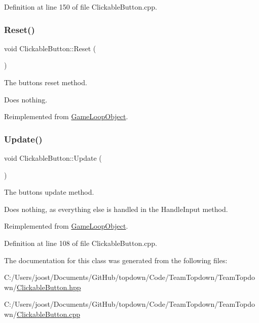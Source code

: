 Definition at line 150 of file Clickable\+Button.\+cpp.

\mbox{\label{class_clickable_button_a01ae3f140debdc8b525e1ef745bdbff3}} 
\subsubsection{\texorpdfstring{Reset()}{Reset()}}
{\footnotesize\ttfamily void Clickable\+Button\+::\+Reset (\begin{DoxyParamCaption}{ }\end{DoxyParamCaption})\hspace{0.3cm}{\ttfamily [virtual]}}



The button\textquotesingle{}s reset method. 

Does nothing. 

Reimplemented from \hyperlink{class_game_loop_object_af61e973be170cb9437a5b7d9ecd6ef53}{Game\+Loop\+Object}.

\mbox{\label{class_clickable_button_a393e1529583626f6ee52f0955bd68da8}} 
\subsubsection{\texorpdfstring{Update()}{Update()}}
{\footnotesize\ttfamily void Clickable\+Button\+::\+Update (\begin{DoxyParamCaption}{ }\end{DoxyParamCaption})\hspace{0.3cm}{\ttfamily [virtual]}}



The button\textquotesingle{}s update method. 

Does nothing, as everything else is handled in the Handle\+Input method. 

Reimplemented from \hyperlink{class_game_loop_object_ae36a15981f1dd3f3bea6050473490349}{Game\+Loop\+Object}.



Definition at line 108 of file Clickable\+Button.\+cpp.



The documentation for this class was generated from the following files\+:\begin{DoxyCompactItemize}
\item 
C\+:/\+Users/joost/\+Documents/\+Git\+Hub/topdown/\+Code/\+Team\+Topdown/\+Team\+Topdown/\hyperlink{_clickable_button_8hpp}{Clickable\+Button.\+hpp}\item 
C\+:/\+Users/joost/\+Documents/\+Git\+Hub/topdown/\+Code/\+Team\+Topdown/\+Team\+Topdown/\hyperlink{_clickable_button_8cpp}{Clickable\+Button.\+cpp}\end{DoxyCompactItemize}
